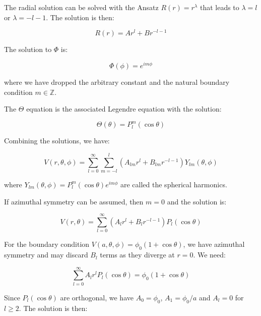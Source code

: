 \documentclass[12pt]{article}
\begin{document}
The radial solution can be solved with the Ansatz $R(r) = r^{\lambda}$ that leads to $\lambda = l$ or $\lambda = -l - 1$. The solution is then:

\begin{equation}
    R(r) = A r^{l} + B r^{-l-1}
\end{equation}

The solution to $\Phi$ is:

\begin{equation}
    \Phi(\phi) = e^{im\phi}
\end{equation}

where we have dropped the arbitrary constant and the natural boundary condition $m \in \mathbb{Z}$. 

The $\Theta$ equation is the associated Legendre equation with the solution:

\begin{equation}
    \Theta(\theta) = P_{l}^{m}(\cos{\theta})
\end{equation}

Combining the solutions, we have:

\begin{equation}
    V(r, \theta, \phi) = \sum_{l = 0}^{\infty} \sum_{m = -l}^{l} \left( A_{lm} r^{l} + B_{lm} r^{-l-1} \right) Y_{lm}(\theta, \phi)
\end{equation}

where $Y_{lm}(\theta, \phi) = P_{l}^{m}(\cos{\theta}) e^{im\phi}$ are called the spherical harmonics.

If azimuthal symmetry can be assumed, then $m = 0$ and the solution is:

\begin{equation}
    V(r, \theta) = \sum_{l = 0}^{\infty} \left( A_{l} r^{l} + B_{l} r^{-l-1} \right) P_{l}(\cos{\theta})
\end{equation}

For the boundary condition $V(a, \theta, \phi) = \phi_{0}(1 + \cos{\theta})$, we have azimuthal symmetry and may discard $B_{l}$ terms as they diverge at $r = 0$. We need:

\begin{equation}
    \sum_{l = 0}^{\infty} A_{l} r^{l}  P_{l}(\cos{\theta}) = \phi_{0}(1 + \cos{\theta})
\end{equation}

Since $P_{l}(\cos{\theta})$ are orthogonal, we have $A_{0} = \phi_{0}$, $A_{1} = \phi_{0}/a$ and $A_{l} = 0$ for $l \geq 2$. The solution is then:
\end{document}
